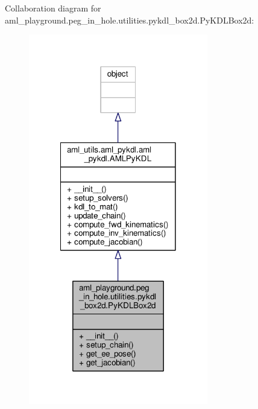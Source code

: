 Collaboration diagram for aml\-\_\-playground.\-peg\-\_\-in\-\_\-hole.\-utilities.\-pykdl\-\_\-box2d.\-Py\-K\-D\-L\-Box2d\-:
\nopagebreak
\begin{figure}[H]
\begin{center}
\leavevmode
\includegraphics[width=222pt]{classaml__playground_1_1peg__in__hole_1_1utilities_1_1pykdl__box2d_1_1_py_k_d_l_box2d__coll__graph}
\end{center}
\end{figure}
